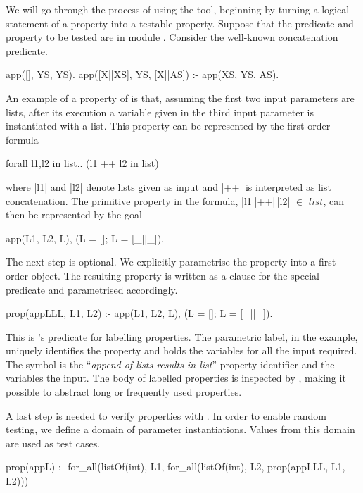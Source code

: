 We will go through the process of using the tool, beginning by turning a logical
statement of a property into a \plqc{} testable property.
%
Suppose that the predicate and property to be tested are in module .
%
Consider the well-known concatenation predicate.
%
\begin{yapcode}
 app([], YS, YS).
 app([X||XS], YS, [X||AS]) :- app(XS, YS, AS).
\end{yapcode}
%
An example of a property of  is that, assuming the first two
input parameters are lists, after its execution a variable given in the third
input parameter is instantiated with a list.
%
This property can be represented by the first order formula
%
\begin{code}
     forall l1,l2 in list.. (l1 ++ l2 in list) 
\end{code}
where |l1| and |l2| denote  lists given as input and |++| is interpreted
as list concatenation. 
% 
The primitive property in the formula, |l1|{}|++|{}$\,$|l2| $\in$ $list$,  can
then be represented by the goal
\begin{yapcode}
  app(L1, L2, L), (L = []; L = [_||_]).
\end{yapcode}







The next step is optional.
%
We explicitly parametrise the property into a first order object.
%
The resulting property
is  written as a clause for the special
predicate  and parametrised accordingly.
%
\begin{yapcode}
 prop({appLLL, L1, L2}) :- app(L1, L2, L), (L = []; L = [_||_]).
\end{yapcode}
%
This is \plqc{}'s predicate for labelling properties.
%
The parametric label,  in the example, uniquely
identifies the property and holds the variables for all the input
required. %
%
The symbol  is the ``\emph{append of lists results in list}''
property identifier and the variables  the input.
%
The body of labelled properties is inspected by \plqc{},
making it possible to abstract long or
frequently used properties.


A last step is needed to verify properties with \plqc{}.
%
In order to enable random testing, we define a domain of parameter
instantiations.
%
Values from this domain are used as test cases.
%
\begin{yapcode}
 prop(appL) :- for_all(listOf(int), L1, for_all(listOf(int), L2,
                   prop({appLLL, L1, L2})))
\end{yapcode}



